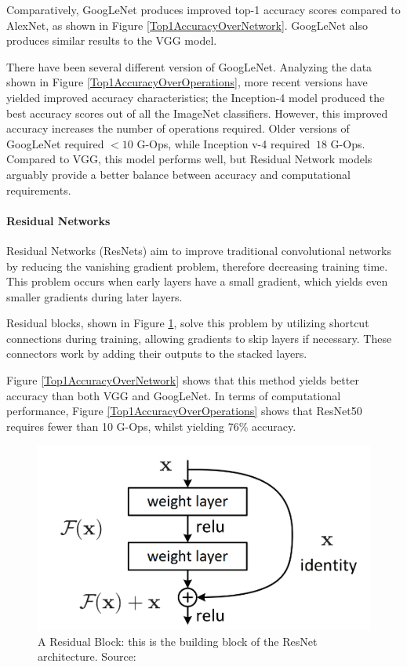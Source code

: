 \documentclass[10pt,a4paper]{article}
\begin{document}
            Comparatively, GoogLeNet produces improved top-1 accuracy scores compared to AlexNet, as shown in Figure \ref{Top1AccuracyOverNetwork}. 
            GoogLeNet also produces similar results to the VGG model.

            There have been several different version of GoogLeNet. Analyzing the data shown in Figure \ref{Top1AccuracyOverOperations}, more recent versions 
            have yielded improved accuracy characteristics; the Inception-4 model produced the best accuracy scores out of all the ImageNet classifiers. However, 
            this improved accuracy increases the number of operations required. Older versions of GoogLeNet required $<10$ G-Ops, while Inception v-4 required $~18$ G-Ops.
            Compared to VGG, this model performs well, but Residual Network models arguably provide a better balance between accuracy and computational requirements.
            
            \paragraph{Residual Networks}
            Residual Networks (ResNets) aim to improve traditional convolutional networks by reducing the vanishing gradient problem, therefore decreasing training time.
            This problem occurs when early layers have a small gradient, which yields even smaller gradients during later layers. 

            Residual blocks, shown in Figure \ref{ResidualBlock}, solve this problem by utilizing shortcut connections during training, allowing gradients to skip layers if necessary. 
            These connectors work by adding their outputs to the stacked layers.

            Figure \ref{Top1AccuracyOverNetwork} shows that this method yields better accuracy than both VGG and GoogLeNet. In terms of computational performance, 
            Figure \ref{Top1AccuracyOverOperations} shows that ResNet50 requires fewer than 10 G-Ops, whilst yielding 76\% accuracy.

            \begin{figure}
                \centering
                \includegraphics[width=.5\linewidth]{ResidualBlock.png}
                \caption{A Residual Block: this is the building block of the ResNet architecture. Source: \cite{DeepResidualNetworks}}
                \label{ResidualBlock}
            \end{figure}
\end{document}
